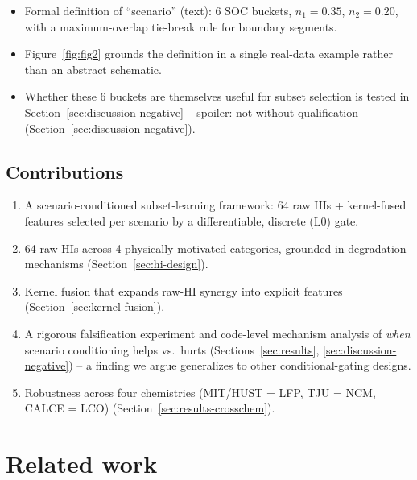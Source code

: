 \documentclass[preprint,12pt]{elsarticle}
\begin{document}
\begin{itemize}
  \item Formal definition of ``scenario'' (text): 6 SOC buckets, $n_1=0.35$, $n_2=0.20$, with a maximum-overlap tie-break rule for boundary segments.
  \item Figure~\ref{fig:fig2} grounds the definition in a single real-data example rather than an abstract schematic.
  \item Whether these 6 buckets are themselves useful for subset selection is tested in Section~\ref{sec:discussion-negative} -- spoiler: not without qualification (Section~\ref{sec:discussion-negative}).
\end{itemize}

\subsection{Contributions}
\label{sec:contributions}

\begin{enumerate}
  \item A scenario-conditioned subset-learning framework: 64 raw HIs + kernel-fused features selected per scenario by a differentiable, discrete (L0) gate.
  \item 64 raw HIs across 4 physically motivated categories, grounded in degradation mechanisms (Section~\ref{sec:hi-design}).
  \item Kernel fusion that expands raw-HI synergy into explicit features (Section~\ref{sec:kernel-fusion}).
  \item A rigorous falsification experiment and code-level mechanism analysis of \emph{when} scenario conditioning helps vs.\ hurts (Sections~\ref{sec:results}, \ref{sec:discussion-negative}) -- a finding we argue generalizes to other conditional-gating designs.
  \item Robustness across four chemistries (MIT/HUST = LFP, TJU = NCM, CALCE = LCO) (Section~\ref{sec:results-crosschem}).
\end{enumerate}

\section{Related work}
\end{document}
